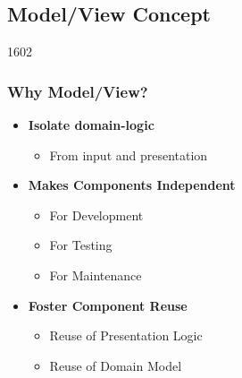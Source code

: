 %
%
%
%

\subsection{Model/View Concept}


\begin{slide}{1602}\frametitle{Why Model/View?}
  \begin{itemize}
  \item \textbf{Isolate domain-logic}
    \begin{itemize}
    \item From input and presentation
    \end{itemize}
  \item \textbf{Makes Components Independent}
    \begin{itemize}
    \item For Development
    \item For Testing
    \item For Maintenance
    \end{itemize}
  \item \textbf{Foster Component Reuse}
    \begin{itemize}
    \item Reuse of Presentation Logic
    \item Reuse of Domain Model
    \end{itemize}
  \end{itemize}
\end{slide}

